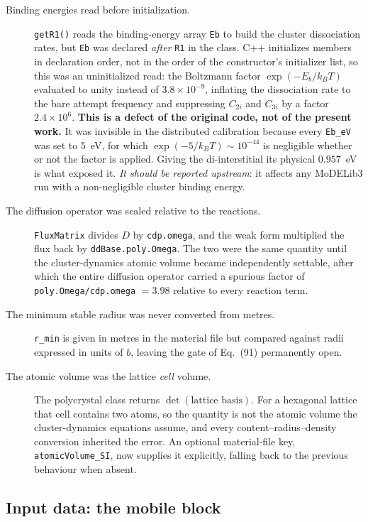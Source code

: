 \documentclass[11pt]{article}
\newcommand{\MoD}{\textsf{MoDELib3}}
\newcommand{\code}[1]{\texttt{\small #1}}
\newcommand{\dref}[1]{Eq.~(#1)}
\begin{document}
\begin{description}
\item[Binding energies read before initialization.]
\code{getR1()} reads the binding-energy array \code{Eb} to build the cluster
dissociation rates, but \code{Eb} was declared \emph{after} \code{R1} in the
class. C++ initializes members in declaration order, not in the order of the
constructor's initializer list, so this was an uninitialized read: the Boltzmann
factor $\exp(-E_b/k_BT)$ evaluated to unity instead of $3.8\times10^{-9}$,
inflating the dissociation rate to the bare attempt frequency and suppressing
$C_{2i}$ and $C_{3i}$ by a factor $2.4\times10^{6}$.
\textbf{This is a defect of the original code, not of the present work.} It was
invisible in the distributed calibration because every \code{Eb\_eV} was set to
5~eV, for which $\exp(-5/k_BT)\sim10^{-44}$ is negligible whether or not the
factor is applied. Giving the di-interstitial its physical $0.957$~eV is what
exposed it. \emph{It should be reported upstream}: it affects any \MoD{} run
with a non-negligible cluster binding energy.

\item[The diffusion operator was scaled relative to the reactions.]
\code{FluxMatrix} divides $D$ by \code{cdp.omega}, and the weak form multiplied
the flux back by \code{ddBase.poly.Omega}. The two were the same quantity until
the cluster-dynamics atomic volume became independently settable, after which
the entire diffusion operator carried a spurious factor of
\code{poly.Omega/cdp.omega} $= 3.98$ relative to every reaction term.

\item[The minimum stable radius was never converted from metres.]
\code{r\_min} is given in metres in the material file but compared against radii
expressed in units of $b$, leaving the gate of \dref{91} permanently open.

\item[The atomic volume was the lattice \emph{cell} volume.]
The polycrystal class returns $\det(\text{lattice basis})$. For a hexagonal
lattice that cell contains two atoms, so the quantity is not the atomic volume
the cluster-dynamics equations assume, and every content--radius--density
conversion inherited the error. An optional material-file key,
\code{atomicVolume\_SI}, now supplies it explicitly, falling back to the previous
behaviour when absent.
\end{description}

\subsection{Input data: the mobile block}
\end{document}
